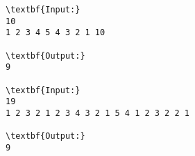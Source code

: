 \begin{verbatim}
\textbf{Input:}
10
1 2 3 4 5 4 3 2 1 10

\textbf{Output:}
9

\textbf{Input:}
19
1 2 3 2 1 2 3 4 3 2 1 5 4 1 2 3 2 2 1

\textbf{Output:}
9\end{verbatim}